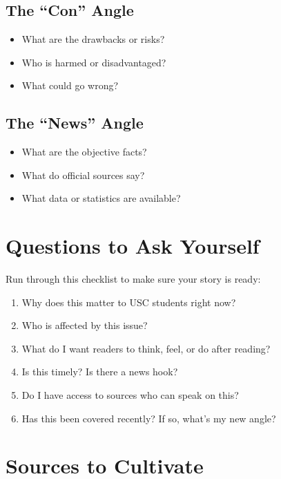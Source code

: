 \documentclass[12pt]{article}
\begin{document}
\subsection*{The ``Con'' Angle}
\begin{itemize}[leftmargin=*]
    \item What are the drawbacks or risks?
    \item Who is harmed or disadvantaged?
    \item What could go wrong?
\end{itemize}

\subsection*{The ``News'' Angle}
\begin{itemize}[leftmargin=*]
    \item What are the objective facts?
    \item What do official sources say?
    \item What data or statistics are available?
\end{itemize}

\section*{Questions to Ask Yourself}

\begin{tipbox}
Run through this checklist to make sure your story is ready:
\begin{enumerate}[leftmargin=*]
    \item Why does this matter to USC students right now?
    \item Who is affected by this issue?
    \item What do I want readers to think, feel, or do after reading?
    \item Is this timely? Is there a news hook?
    \item Do I have access to sources who can speak on this?
    \item Has this been covered recently? If so, what's my new angle?
\end{enumerate}
\end{tipbox}

\section*{Sources to Cultivate}
\end{document}
